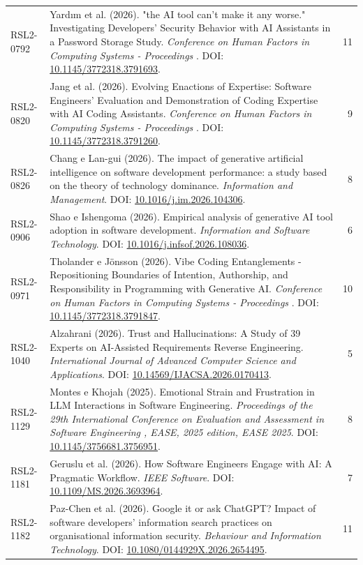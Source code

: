 \begin{small}
\begin{longtable}{lp{11.2cm}r}
RSL2-0792 & Yard{\i}m et al. (2026). "the AI tool can't make it any worse." Investigating Developers' Security Behavior with AI Assistants in a Password Storage Study. \textit{Conference on Human Factors in Computing Systems - Proceedings }. DOI: \url{10.1145/3772318.3791693}. & 11 \\
RSL2-0820 & Jang et al. (2026). Evolving Enactions of Expertise: Software Engineers' Evaluation and Demonstration of Coding Expertise with AI Coding Assistants. \textit{Conference on Human Factors in Computing Systems - Proceedings }. DOI: \url{10.1145/3772318.3791260}. & 9 \\
RSL2-0826 & Chang e Lan-gui (2026). The impact of generative artificial intelligence on software development performance: a study based on the theory of technology dominance. \textit{Information and Management}. DOI: \url{10.1016/j.im.2026.104306}. & 8 \\
RSL2-0906 & Shao e Ishengoma (2026). Empirical analysis of generative AI tool adoption in software development. \textit{Information and Software Technology}. DOI: \url{10.1016/j.infsof.2026.108036}. & 6 \\
RSL2-0971 & Tholander e Jönsson (2026). Vibe Coding Entanglements - Repositioning Boundaries of Intention, Authorship, and Responsibility in Programming with Generative AI. \textit{Conference on Human Factors in Computing Systems - Proceedings }. DOI: \url{10.1145/3772318.3791847}. & 10 \\
RSL2-1040 & Alzahrani (2026). Trust and Hallucinations: A Study of 39 Experts on AI-Assisted Requirements Reverse Engineering. \textit{International Journal of Advanced Computer Science and Applications}. DOI: \url{10.14569/IJACSA.2026.0170413}. & 5 \\
RSL2-1129 & Montes e Khojah (2025). Emotional Strain and Frustration in LLM Interactions in Software Engineering. \textit{Proceedings of the 29th International Conference on Evaluation and Assessment in Software Engineering , EASE, 2025 edition, EASE 2025}. DOI: \url{10.1145/3756681.3756951}. & 8 \\
RSL2-1181 & Geruslu et al. (2026). How Software Engineers Engage with AI: A Pragmatic Workflow. \textit{IEEE Software}. DOI: \url{10.1109/MS.2026.3693964}. & 7 \\
RSL2-1182 & Paz-Chen et al. (2026). Google it or ask ChatGPT? Impact of software developers' information search practices on organisational information security. \textit{Behaviour and Information Technology}. DOI: \url{10.1080/0144929X.2026.2654495}. & 11 \\

\end{longtable}
\end{small}
